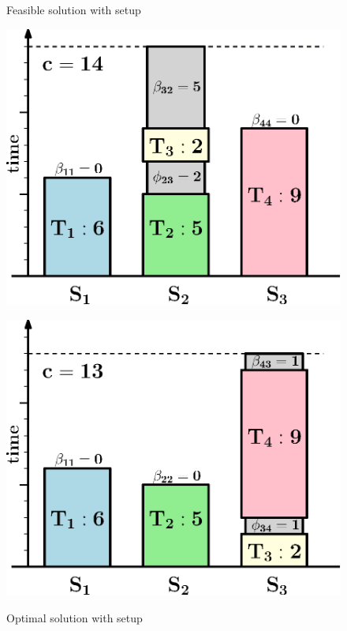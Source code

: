 \begin{figure}[tpb]
	\centering
	\begin{minipage}{0.47\textwidth}
		\centering
		\caption{Feasible solution with setup}
		\vspace{2mm}
		\includegraphics[width=\linewidth]{images/exSimpleSetupFeas.eps}
		\label{fig:intro:exSchedSetupFeas}
	\end{minipage}
	\hfill
	\begin{minipage}{0.47\textwidth}
		\centering
		\caption{Optimal solution with setup}
		\vspace{2mm}
		\includegraphics[width=\linewidth]{images/exSimpleSetupOpt.eps}
		\label{fig:intro:exSchedSetupOpt}
	\end{minipage}
\end{figure}

